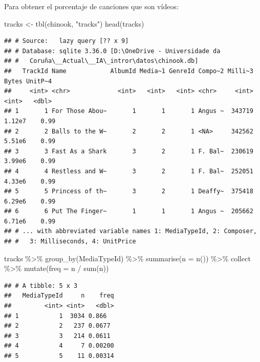 \documentclass[
]{book}
\newenvironment{Shaded}{\begin{snugshade}}{\end{snugshade}}
\newcommand{\AttributeTok}[1]{\textcolor[rgb]{0.77,0.63,0.00}{#1}}
\newcommand{\FunctionTok}[1]{\textcolor[rgb]{0.00,0.00,0.00}{#1}}
\newcommand{\NormalTok}[1]{#1}
\newcommand{\OtherTok}[1]{\textcolor[rgb]{0.56,0.35,0.01}{#1}}
\newcommand{\SpecialCharTok}[1]{\textcolor[rgb]{0.00,0.00,0.00}{#1}}
\newcommand{\StringTok}[1]{\textcolor[rgb]{0.31,0.60,0.02}{#1}}
\theoremstyle{break}
\theoremstyle{nonumberplain}
\begin{document}
Para obtener el porcentaje de canciones que son vídeos:

\begin{Shaded}
\begin{Highlighting}[]
\NormalTok{tracks }\OtherTok{\textless{}{-}} \FunctionTok{tbl}\NormalTok{(chinook, }\StringTok{"tracks"}\NormalTok{)}
\FunctionTok{head}\NormalTok{(tracks) }
\end{Highlighting}
\end{Shaded}

\begin{verbatim}
## # Source:   lazy query [?? x 9]
## # Database: sqlite 3.36.0 [D:\OneDrive - Universidade da
## #   Coruña\__Actual\__IA\_intror\datos\chinook.db]
##   TrackId Name            AlbumId Media~1 GenreId Compo~2 Milli~3  Bytes UnitP~4
##     <int> <chr>             <int>   <int>   <int> <chr>     <int>  <int>   <dbl>
## 1       1 For Those Abou~       1       1       1 Angus ~  343719 1.12e7    0.99
## 2       2 Balls to the W~       2       2       1 <NA>     342562 5.51e6    0.99
## 3       3 Fast As a Shark       3       2       1 F. Bal~  230619 3.99e6    0.99
## 4       4 Restless and W~       3       2       1 F. Bal~  252051 4.33e6    0.99
## 5       5 Princess of th~       3       2       1 Deaffy~  375418 6.29e6    0.99
## 6       6 Put The Finger~       1       1       1 Angus ~  205662 6.71e6    0.99
## # ... with abbreviated variable names 1: MediaTypeId, 2: Composer,
## #   3: Milliseconds, 4: UnitPrice
\end{verbatim}

\begin{Shaded}
\begin{Highlighting}[]
\NormalTok{tracks }\SpecialCharTok{\%\textgreater{}\%} \FunctionTok{group\_by}\NormalTok{(MediaTypeId) }\SpecialCharTok{\%\textgreater{}\%} 
    \FunctionTok{summarise}\NormalTok{(}\AttributeTok{n =} \FunctionTok{n}\NormalTok{()) }\SpecialCharTok{\%\textgreater{}\%}\NormalTok{ collect }\SpecialCharTok{\%\textgreater{}\%} \FunctionTok{mutate}\NormalTok{(}\AttributeTok{freq =}\NormalTok{ n }\SpecialCharTok{/} \FunctionTok{sum}\NormalTok{(n))}
\end{Highlighting}
\end{Shaded}

\begin{verbatim}
## # A tibble: 5 x 3
##   MediaTypeId     n    freq
##         <int> <int>   <dbl>
## 1           1  3034 0.866  
## 2           2   237 0.0677 
## 3           3   214 0.0611 
## 4           4     7 0.00200
## 5           5    11 0.00314
\end{verbatim}
\end{document}
